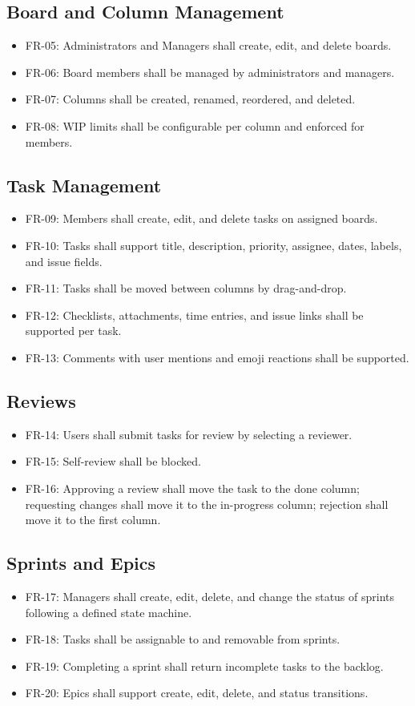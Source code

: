 \documentclass[12pt,a4paper]{report}
\begin{document}
\subsection{Board and Column Management}
\begin{itemize}
  \item FR-05: Administrators and Managers shall create, edit, and delete boards.
  \item FR-06: Board members shall be managed by administrators and managers.
  \item FR-07: Columns shall be created, renamed, reordered, and deleted.
  \item FR-08: WIP limits shall be configurable per column and enforced for members.
\end{itemize}
\subsection{Task Management}
\begin{itemize}
  \item FR-09: Members shall create, edit, and delete tasks on assigned boards.
  \item FR-10: Tasks shall support title, description, priority, assignee, dates,
        labels, and issue fields.
  \item FR-11: Tasks shall be moved between columns by drag-and-drop.
  \item FR-12: Checklists, attachments, time entries, and issue links shall be
        supported per task.
  \item FR-13: Comments with user mentions and emoji reactions shall be supported.
\end{itemize}
\subsection{Reviews}
\begin{itemize}
  \item FR-14: Users shall submit tasks for review by selecting a reviewer.
  \item FR-15: Self-review shall be blocked.
  \item FR-16: Approving a review shall move the task to the done column;
        requesting changes shall move it to the in-progress column; rejection shall
        move it to the first column.
\end{itemize}
\subsection{Sprints and Epics}
\begin{itemize}
  \item FR-17: Managers shall create, edit, delete, and change the status of
        sprints following a defined state machine.
  \item FR-18: Tasks shall be assignable to and removable from sprints.
  \item FR-19: Completing a sprint shall return incomplete tasks to the backlog.
  \item FR-20: Epics shall support create, edit, delete, and status transitions.
\end{itemize}
\end{document}
